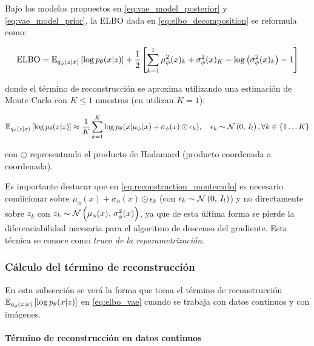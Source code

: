 \begin{prop}
    Bajo los modelos propuestos en \eqref{eq:vae_model_posterior} y \eqref{eq:vae_model_prior}, la ELBO dada en \eqref{eq:elbo_decomposition} se reformula como:

    \begin{equation}
        \label{eq:elbo_vae}
        \operatorname{ELBO}
        = \mathbb{E}_{q_\phi(z|x)}\left[\log p_\theta(x|z)\right] + \frac{1}{2}\left[
            \sum_{k=1}^1 \mu_\phi^2(x)_k + \sigma_\phi^2(x)_K
            - \log\left(\sigma_\phi^2(x)_k\right) - 1\right]
    \end{equation}

    donde el término de reconstrucción se aproxima utilizando una estimación de Monte Carlo con $K\leq 1$ muestras (en \cite{kingma2022autoencoding} utilizan $K=1$):

    \begin{equation}
        \label{eq:reconstruction_montecarlo}
        \mathbb{E}_{q_\phi(z|x)}\left[\log p_\theta(x|z)\right]
        \approx \frac{1}{K}\sum_{k=1}^K \log p_\theta(x|\mu_\phi(x)+\sigma_\phi(x)\odot\epsilon_k),
        \quad
        \epsilon_k \sim \mathcal{N}\left(0,\,I_l\right), \forall k\in\{1\ldots K\}
    \end{equation}

    con $\odot$ representando el producto de Hadamard (producto coordenada a coordenada).
\end{prop}

Es importante destacar que en \eqref{eq:reconstruction_montecarlo} es necesario condicionar sobre $\mu_\phi(x)+\sigma_\phi(x)\odot\epsilon_k$ (con $\epsilon_k\sim\mathcal{N}\left(0,\,I_l\right)$) y no directamente sobre $z_k$ con $z_k\sim \mathcal{N}\left(\mu_\phi(x),\,\sigma^2_\phi(x)\right)$, ya que de esta última forma se pierde la diferenciabilidad necesaria para el algoritmo de descenso del gradiente. Esta técnica se conoce como \textit{truco de la reparametrización}.

\subsubsection{Cálculo del término de reconstrucción}

En esta subsección se verá la forma que toma el término de reconstrucción $\mathbb{E}_{q_\phi(z|x)}\left[\log p_\theta(x|z)\right]$ en \eqref{eq:elbo_vae} cuando se trabaja con datos continuos y con imágenes.

\paragraph{Término de reconstrucción en datos continuos}

